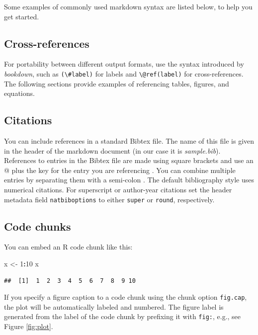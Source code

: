 \documentclass[9pt,a4paper,]{extarticle}
\newenvironment{Shaded}{\begin{snugshade}}{\end{snugshade}}
\newcommand{\DecValTok}[1]{\textcolor[rgb]{0.00,0.00,0.81}{#1}}
\newcommand{\StringTok}[1]{\textcolor[rgb]{0.31,0.60,0.02}{#1}}
\newcommand{\OperatorTok}[1]{\textcolor[rgb]{0.81,0.36,0.00}{\textbf{#1}}}
\newcommand{\NormalTok}[1]{#1}
\begin{document}
Some examples of commonly used markdown syntax are listed below, to help you get started.

\subsection{Cross-references}\label{cross-references}

For portability between different output formats, use the syntax introduced by \emph{bookdown}, such as \texttt{(\textbackslash{}\#label)} for labels and \texttt{\textbackslash{}@ref(label)} for cross-references. The following sections provide examples of referencing tables, figures, and equations.

\subsection{Citations}\label{citations}

You can include references in a standard Bibtex file. The name of this file is given in the header of the markdown document (in our case it is \emph{sample.bib}). References to entries in the Bibtex file are made using square brackets and use an @ plus the key for the entry you are referencing \citep{Smith:2012qr}. You can combine multiple entries by separating them with a semi-colon \citep{Smith:2012qr, Smith:2013jd}.
The default bibliography style uses numerical citations. For superscript or author-year citations set the header metadata field \texttt{natbiboptions} to either \texttt{super} or \texttt{round}, respectively.

\subsection{Code chunks}\label{code-chunks}

You can embed an R code chunk like this:

\begin{Shaded}
\begin{Highlighting}[]
\NormalTok{x <-}\StringTok{ }\DecValTok{1}\OperatorTok{:}\DecValTok{10}
\NormalTok{x}
\end{Highlighting}
\end{Shaded}

\begin{verbatim}
##  [1]  1  2  3  4  5  6  7  8  9 10
\end{verbatim}

If you specify a figure caption to a code chunk using the chunk option \texttt{fig.cap}, the plot will be automatically labeled and numbered. The figure label is generated from the label of the code chunk by prefixing it with \texttt{fig:}, e.g., see Figure \ref{fig:plot}.
\end{document}
